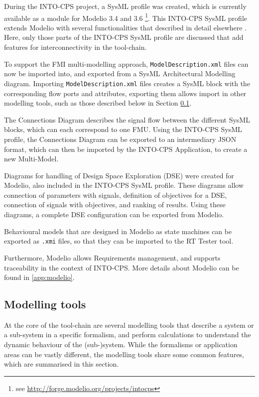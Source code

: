 During the INTO-CPS project, a SysML profile was created, which is currently available as a module for Modelio 3.4 and 3.6 \footnote{see \url{http://forge.modelio.org/projects/intocps}}. This INTO-CPS SysML profile extends Modelio with several functionalities that described in detail elsewhere \cite{INTOCPSD41c,INTOCPSD4.2c,INTOCPSD4.3c}. Here, only those parts of the INTO-CPS SysML profile are discussed that add features for interconnectivity in the tool-chain.

To support the FMI multi-modelling approach, \texttt{ModelDescription.xml} files can now be imported into, and exported from a SysML Architectural Modelling diagram. Importing \texttt{ModelDescription.xml} files creates a SysML block with the corresponding flow ports and attributes, exporting them allows import in other modelling tools, such as those described below in Section \ref{sec:toolchain:tools}.

The Connections Diagram describes the signal flow between the different SysML blocks, which can each correspond to one FMU. Using the INTO-CPS SysML profile, the Connections Diagram can be exported to an intermediary JSON format, which can then be imported by the INTO-CPS Application, to create a new Multi-Model.

Diagrams for handling of Design Space Exploration (DSE) were created for Modelio, also included in the INTO-CPS SysML profile. These diagrams allow connection of parameters with signals, definition of objectives for a DSE, connection of signals with objectives, and ranking of results. Using these diagrams, a complete DSE configuration can be exported from Modelio.

Behavioural models that are designed in Modelio as state machines can be exported as \texttt{.xmi} files, so that they can be imported to the RT Tester tool.

Furthermore, Modelio allows Requirements management, and supports traceability in the context of INTO-CPS. More details about Modelio can be found in \autoref{app:modelio}.

\subsection{Modelling tools}
\label{sec:toolchain:tools}

At the core of the tool-chain are several modelling tools that describe a system or a sub-system in a specific formalism, and perform calculations to understand the dynamic behaviour of the (sub-)system. While the formalisms or application areas can be vastly different, the modelling tools share some common features, which are summarised in this section. 

